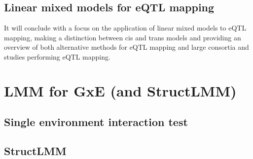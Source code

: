 \subsection{Linear mixed models for eQTL mapping}

It will conclude with a focus on the application of linear mixed models to eQTL mapping, making a distinction between cis and trans models and providing an overview of both alternative methods for eQTL mapping and large consortia and studies performing eQTL mapping.

\section{LMM for GxE (and StructLMM)}

\subsection{Single environment interaction test}
\subsection{StructLMM}

